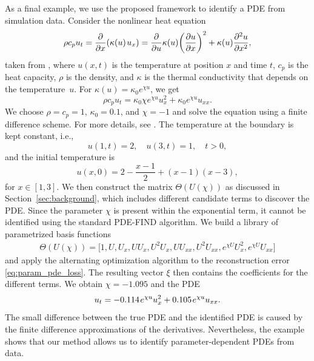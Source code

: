 \documentclass
[
    a4paper,
    DIV=11,
    abstract=true,
    11pt,
]
{scrartcl}
\newcommand{\ts}{\hspace*{0.1em}}                                %
\theoremstyle{definition}
\begin{document}
As a final example, we use the proposed framework to identify a PDE from simulation data. Consider the nonlinear heat equation
\begin{equation*}
    \rho c_p u_t = \frac{\partial}{\partial x}(\kappa(u) \ts u_x) = \frac{\partial}{\partial u}\kappa(u) \bigg(\frac{\partial u}{\partial x}\bigg)^2 + \kappa(u)\frac{\partial^2 u}{\partial x^2},
\end{equation*}
taken from \cite{filipov2018implicit}, where $u(x,t)$ is the temperature at position $x$ and time $t$, $c_p$ is the heat capacity, $\rho$ is the density, and $\kappa$ is the thermal conductivity that depends on the temperature~$u$. For $\kappa(u) = \kappa_0 e^{\chi u} $, we get
\begin{equation*}
    \rho c_p u_t = \kappa_0 \chi e^{\chi u} u_x^2 + \kappa_0 e^{\chi u} u_{xx}.
\end{equation*}
We choose $\rho = c_p = 1$, $\kappa_0 = 0.1$, and $\chi = -1$ and solve the equation using a finite difference scheme. For more details, see \cite{filipov2018implicit}. The temperature at the boundary is kept constant, i.e.,
\begin{equation*}
    u(1,t) = 2, \quad u(3,t) = 1, \quad t > 0,
\end{equation*}
and the initial temperature is
\begin{equation*}
    u(x, 0) = 2 - \frac{x - 1}{2} + (x - 1)(x - 3),
\end{equation*}
for $ x \in [1, 3] $. We then construct the matrix $\Theta(U(\chi))$ as discussed in Section~\ref{sec:background}, which includes different candidate terms to discover the PDE. Since the parameter $\chi$ is present within the exponential term, it cannot be identified using the standard PDE-FIND algorithm. We build a library of parametrized basis functions
\begin{align*}
    \Theta(U(\chi)) = \big [1, U, U_x, U U_x, U^2 U_x, U U_{xx}, U^2 U_{xx}, e^{\chi U}U_{x}^2, e^{\chi U} U_{xx}\big]
\end{align*}
and apply the alternating optimization algorithm to the reconstruction error \eqref{eq:param_pde_loss}. The resulting vector $\xi$ then contains the coefficients for the different terms. We obtain $\chi = -1.095$ and the PDE
\begin{equation*}
    u_t = -0.114 \ts e^{\chi u} u_x^2 + 0.105 \ts e^{\chi u} u_{xx}.
\end{equation*}
The small difference between the true PDE and the identified PDE is caused by the finite difference approximations of the derivatives. Nevertheless, the example shows that our method allows us to identify parameter-dependent PDEs from data.
\end{document}

